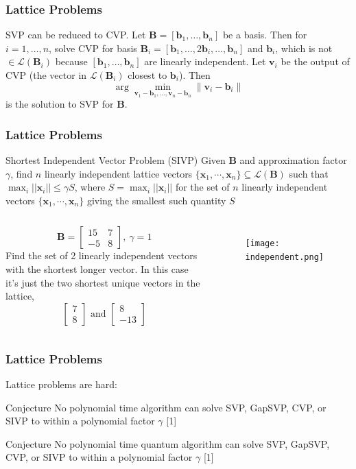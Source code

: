 \documentclass{beamer}
\renewcommand{\v}{\mathbf}
\begin{document}
\begin{frame}
\frametitle{Lattice Problems}
SVP can be reduced to CVP. Let $\v{B} = [\v{b}_1, \ldots, \v{b}_n]$
be a basis. Then for $i = 1,\ldots,n$, solve CVP for basis
$\v{B}_i=[\v{b}_1,\ldots,2\v{b}_i,\ldots,\v{b}_n]$ and $\v{b}_i$,
which is not $\in \mathcal{L}(\v{B}_i)$ because $[\v{b}_1, \ldots, \v{b}_n]$ are linearly independent. Let $\v{v}_i$ be the output of CVP (the vector in 
$\mathcal{L}(\v{B}_i)$ closest to $\v{b}_i$). Then
\[
    \arg\min_{\v{v}_1-\v{b}_1,\ldots,\v{v}_n-\v{b}_n}{\|\v{v}_i-\v{b}_i\|}
\]
is the solution to SVP for $\v{B}$.
\end{frame}
\begin{frame}
\frametitle{Lattice Problems}
\begin{block}{Shortest Independent Vector Problem (SIVP)}
    Given $\v{B}$ and approximation factor $\gamma$, find $n$ linearly 
    independent lattice vectors $\{\v{x}_1, \cdots, \v{x}_n\} \subseteq
    \mathcal{L}(\v{B})$ such that $\max_i{||\v{x}_i||} \leq \gamma S$,
    where $S = \max_i{||\v{x}_i||}$ for the set of $n$ linearly independent
    vectors $\{\v{x}_1,\cdots,\v{x}_n\}$ giving the smallest such quantity $S$ 
\end{block}
\begin{columns}
\[
    \v{B} = \begin{bmatrix}15 & 7 \\ -5 & 8 \end{bmatrix},\ 
    \gamma = 1
\]
Find the set of 2 linearly independent vectors with the shortest
longer vector. In this case it's just the two shortest unique
vectors in the lattice,
\[
    \begin{bmatrix} 7 \\ 8 \end{bmatrix}
    \text{ and }
    \begin{bmatrix} 8 \\ -13 \end{bmatrix}
\]
\begin{figure}
    \texttt{[image: independent.png]}
\end{figure}
\end{columns}
\end{frame}

\begin{frame}
\frametitle{Lattice Problems}
Lattice problems are hard:
\begin{block}{Conjecture}
    No polynomial time algorithm can solve SVP, GapSVP, CVP, or SIVP to within a polynomial factor $\gamma$ [1]
\end{block}
\begin{block}{Conjecture}
    No polynomial time quantum algorithm can solve SVP, GapSVP, CVP, or SIVP to within a polynomial factor $\gamma$ [1]
\end{block}
\end{frame}
\end{document}
